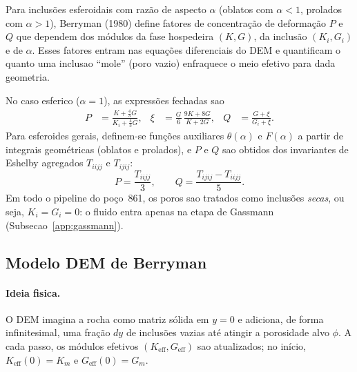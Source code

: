 \documentclass[11pt,a4paper]{article}
\numberwithin{equation}{section}
\begin{document}
Para inclusões esferoidais com razão de aspecto $\alpha$ (oblatos com
$\alpha < 1$, prolados com $\alpha > 1$), Berryman (1980) define fatores de
concentração de deformação $P$ e $Q$ que dependem dos módulos da fase
hospedeira $(K,G)$, da inclusão $(K_i,G_i)$ e de $\alpha$.
Esses fatores entram nas equações diferenciais do DEM e quantificam o quanto
uma inclusao ``mole'' (poro vazio) enfraquece o meio efetivo para dada
geometria.

No caso esferico ($\alpha = 1$), as expressões fechadas sao
\begin{align}
  P &= \frac{K + \frac{4}{3}G}{K_i + \frac{4}{3}G},
  &
  \xi &= \frac{G}{6}\,\frac{9K + 8G}{K + 2G},
  &
  Q &= \frac{G + \xi}{G_i + \xi}.
  \label{eq:pq_sphere}
\end{align}
Para esferoides gerais, definem-se funções auxiliares $\theta(\alpha)$ e
$F(\alpha)$ a partir de integrais geométricas (oblatos e prolados), e $P$ e $Q$
sao obtidos dos invariantes de Eshelby agregados $T_{iijj}$ e $T_{ijij}$:
\begin{equation}
  P = \frac{T_{iijj}}{3},
  \qquad
  Q = \frac{T_{ijij} - T_{iijj}}{5}.
  \label{eq:pq_general}
\end{equation}
Em todo o pipeline do poço~861, os poros sao tratados como inclusões
\emph{secas}, ou seja, $K_i = G_i = 0$: o fluido entra apenas na etapa de
Gassmann (Subsecao~\ref{app:gassmann}).

\subsection{Modelo DEM de Berryman}

\paragraph{Ideia fisica.}
O DEM imagina a rocha como matriz sólida em $y=0$ e adiciona, de forma
infinitesimal, uma fração $dy$ de inclusões vazias até atingir a porosidade
alvo $\phi$.
A cada passo, os módulos efetivos $(K_{\mathrm{eff}}, G_{\mathrm{eff}})$ sao
atualizados; no início, $K_{\mathrm{eff}}(0)=K_m$ e $G_{\mathrm{eff}}(0)=G_m$.
\end{document}

